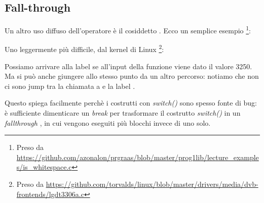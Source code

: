 \subsection{Fall-through}

Un altro uso diffuso dell'operatore  è il cosiddetto .
Ecco un semplice esempio \footnote{Preso da \url{https://github.com/azonalon/prgraas/blob/master/prog1lib/lecture_examples/is_whitespace.c}}:



Uno leggermente più difficile, dal kernel di Linux \footnote{Preso da \url{https://github.com/torvalds/linux/blob/master/drivers/media/dvb-frontends/lgdt3306a.c}}:





Possiamo arrivare alla label  se all'input della funzione viene dato il valore 3250.
Ma si può anche giungere allo stesso punto da un altro percorso:
notiamo che non ci sono jump tra la chiamata a \printf e la label .

Questo spiega facilmente perchè i costrutti con \emph{switch()} sono spesso fonte di bug:
è sufficiente dimenticare un \emph{break} per trasformare il costrutto \emph{switch()} in un \emph{fallthrough} , in cui vengono eseguiti
più blocchi invece di uno solo.
